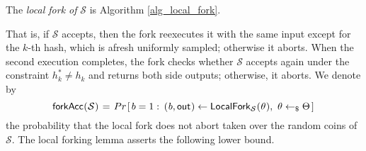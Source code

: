 \documentclass{iacrtrans}
\begin{document}
\begin{defn}\label{def_local_fork}
The \textit{local fork of} $\mathcal{S}$ is
Algorithm \ref{alg_local_fork}.
\end{defn}

\noindent
That is, if $\mathcal{S}$ accepts, then
the fork reexecutes it with the same input except
for the $k$-th hash, which is
afresh uniformly sampled; otherwise it aborts.
When the second execution completes, the fork checks
whether $\mathcal{S}$ accepts again under the constraint
$h_k^* \neq h_k$ and returns both side outputs;
otherwise, it aborts. We denote by
\vspace{5pt}
\begin{equation}\label{local_forking_forkacc}
\mathsf{forkAcc}
\hspace{0.3pt}
(
	\hspace{0.3pt}
	\mathcal{S}
	\hspace{0.3pt}
)
\hspace{1pt}
=
\hspace{1pt}
Pr\hspace{1pt}[\hspace{1.5pt}b = 1 :
\hspace{2pt}(
	\hspace{0.5pt}
	b,
	\mathsf{out}
	\hspace{0.5pt}
)
\leftarrow
\mathsf{LocalFork}_{\mathcal{S}}
	\hspace{0.3pt}(
	\hspace{0.3pt}
	\theta
	\hspace{0.3pt}
),
\ \theta \leftarrow_\$ \Theta
\hspace{1.5pt}]\hspace{1pt}
\vspace{8pt}
\end{equation}
the probability that the local fork does not abort
taken over the random coins of $\mathcal{S}$.
The local forking lemma asserts the following lower bound.
\end{document}
